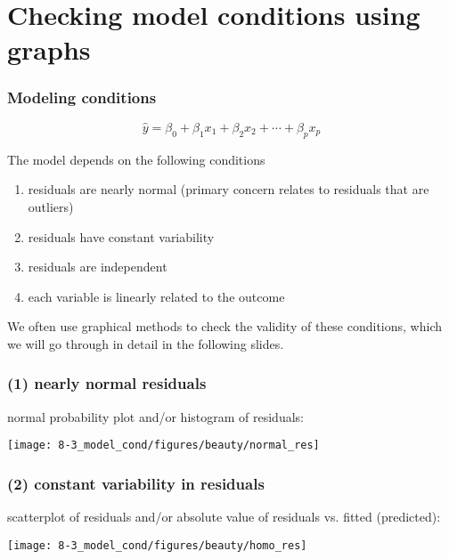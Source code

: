 \section{Checking model conditions using graphs}


\begin{frame}
\frametitle{Modeling conditions}

\[ \hat{y} = \beta_0 + \beta_1 x_1 + \beta_2 x_2 + \cdots + \beta_p x_p \] 

$\:$ \\

The model depends on the following conditions
\begin{enumerate}
\item residuals are nearly normal (primary concern relates to residuals that are outliers)
\item residuals have constant variability
\item residuals are independent
\item each variable is linearly related to the outcome \\
\end{enumerate}

We often use graphical methods to check the validity of these conditions, which we will go through in detail in the following slides.

\end{frame}


\begin{frame}
\frametitle{(1) nearly normal residuals}

normal probability plot and/or histogram of residuals: \\

\begin{center}
\texttt{[image: 8-3\_model\_cond/figures/beauty/normal\_res]}
\end{center}


\end{frame}


\begin{frame}
\frametitle{(2) constant variability in residuals}

scatterplot of residuals and/or absolute value of residuals vs. fitted (predicted): \\

\begin{center}
\texttt{[image: 8-3\_model\_cond/figures/beauty/homo\_res]}
\end{center}


\end{frame}

